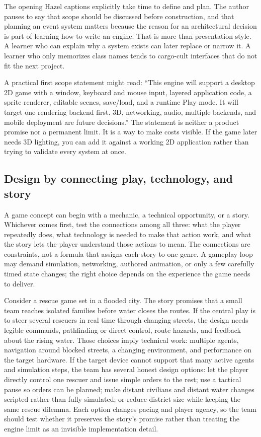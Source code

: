 The opening Hazel captions explicitly take time to define and plan. The author pauses to say that scope should be discussed before construction, and that planning an event system matters because the reason for an architectural decision is part of learning how to write an engine. That is more than presentation style. A learner who can explain why a system exists can later replace or narrow it. A learner who only memorizes class names tends to cargo-cult interfaces that do not fit the next project.

A practical first scope statement might read: ``This engine will support a desktop 2D game with a window, keyboard and mouse input, layered application code, a sprite renderer, editable scenes, save/load, and a runtime Play mode. It will target one rendering backend first. 3D, networking, audio, multiple backends, and mobile deployment are future decisions.'' The statement is neither a product promise nor a permanent limit. It is a way to make costs visible. If the game later needs 3D lighting, you can add it against a working 2D application rather than trying to validate every system at once.

\subsection{Design by connecting play, technology, and story}\label{05-engine-i-ch009-design-by-connecting-play-technology-and-story}

\hypertarget{05-engine-i-ch009-design-by-connecting-play-technology-and-story}{}

A game concept can begin with a mechanic, a technical opportunity, or a story. Whichever comes first, test the connections among all three: what the player repeatedly does, what technology is needed to make that action work, and what the story lets the player understand those actions to mean. The connections are constraints, not a formula that assigns each story to one genre. A gameplay loop may demand simulation, networking, authored animation, or only a few carefully timed state changes; the right choice depends on the experience the game needs to deliver.

Consider a rescue game set in a flooded city. The story promises that a small team reaches isolated families before water closes the routes. If the central play is to steer several rescuers in real time through changing streets, the design needs legible commands, pathfinding or direct control, route hazards, and feedback about the rising water. Those choices imply technical work: multiple agents, navigation around blocked streets, a changing environment, and performance on the target hardware. If the target device cannot support that many active agents and simulation steps, the team has several honest design options: let the player directly control one rescuer and issue simple orders to the rest; use a tactical pause so orders can be planned; make distant civilians and distant water changes scripted rather than fully simulated; or reduce district size while keeping the same rescue dilemma. Each option changes pacing and player agency, so the team should test whether it preserves the story's promise rather than treating the engine limit as an invisible implementation detail.

